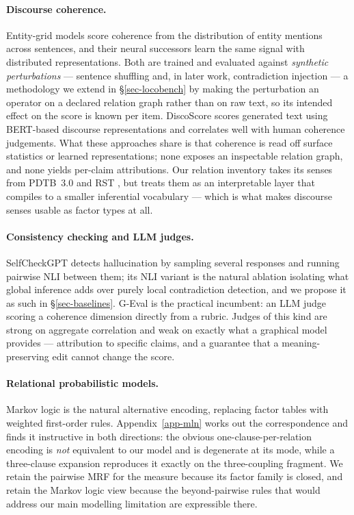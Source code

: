 \paragraph{Discourse coherence.} Entity-grid models \citep{barzilay} score coherence from the
distribution of entity mentions across sentences, and their neural successors \citep{li} learn the
same signal with distributed representations. Both are trained and evaluated against
\emph{synthetic perturbations} --- sentence shuffling and, in later work, contradiction injection
--- a methodology we extend in \S\ref{sec-locobench} by making the perturbation an operator on a
declared relation graph rather than on raw text, so its intended effect on the score is known per
item. DiscoScore \citep{discoscore} scores generated text using BERT-based discourse
representations and correlates well with human coherence judgements. What these approaches share
is that coherence is read off surface statistics or learned representations; none exposes an
inspectable relation graph, and none yields per-claim attributions. Our relation inventory takes
its senses from PDTB~3.0 \citep{pdtb} and RST \citep{mann}, but treats them as an interpretable
layer that compiles to a smaller inferential vocabulary --- which is what makes discourse senses
usable as factor types at all.

\paragraph{Consistency checking and LLM judges.} SelfCheckGPT \citep{selfcheckgpt} detects
hallucination by sampling several responses and running pairwise NLI between them; its NLI variant
is the natural ablation isolating what global inference adds over purely local contradiction
detection, and we propose it as such in \S\ref{sec-baselines}. G-Eval \citep{geval} is the
practical incumbent: an LLM judge scoring a coherence dimension directly from a rubric. Judges of
this kind are strong on aggregate correlation and weak on exactly what a graphical model provides
--- attribution to specific claims, and a guarantee that a meaning-preserving edit cannot change
the score.

\paragraph{Relational probabilistic models.} Markov logic \citep{mln} is the natural alternative
encoding, replacing factor tables with weighted first-order rules. Appendix~\ref{app-mln} works
out the correspondence and finds it instructive in both directions: the obvious
one-clause-per-relation encoding is \emph{not} equivalent to our model and is degenerate at its
mode, while a three-clause expansion reproduces it exactly on the three-coupling fragment. We
retain the pairwise MRF for the measure because its factor family is closed, and retain the Markov
logic view because the beyond-pairwise rules that would address our main modelling limitation are
expressible there.

